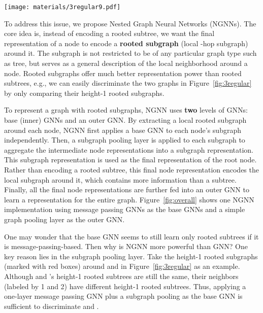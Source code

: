 \documentclass{article}
\begin{document}
\begin{figure*}[t]
\centering
\texttt{[image: materials/3regular9.pdf]}
\caption{The two original graphs  and  are non-isomorphic.  is composed of two triangles, while  is a hexagon. However, both 1-WL and message passing GNNs cannot differentiate them, since all nodes in the two graphs share identical rooted subtrees at any height (see the rooted subtrees around  and  in the middle block for example). In comparison, we can discriminate the two graphs by comparing their height-1 rooted subgraphs around any nodes. For example, the height-1 rooted subgraph around  is a closed triangle, but the height-1 rooted subgraph around  is an open triangle (see the red boxes in the right block).}
\label{fig:3regular}
\end{figure*}


To address this issue, we propose Nested Graph Neural Networks (NGNNs). The core idea is, instead of encoding a rooted subtree, we want the final representation of a node to encode a \textbf{rooted subgraph} (local -hop subgraph) around it. The subgraph is not restricted to be of any particular graph type such as tree, but serves as a general description of the local neighborhood around a node. Rooted subgraphs offer much better representation power than rooted subtrees, e.g., we can easily discriminate the two graphs in Figure~\ref{fig:3regular} by only comparing their height-1 rooted subgraphs.

To represent a graph with rooted subgraphs, NGNN uses \textbf{two} levels of GNNs: base (inner) GNNs and an outer GNN. By extracting a local rooted subgraph around each node, NGNN first applies a base GNN to each node's subgraph independently. Then, a subgraph pooling layer is applied to each subgraph to aggregate the intermediate node representations into a subgraph representation. This subgraph representation is used as the final representation of the root node. Rather than encoding a rooted subtree, this final node representation encodes the local subgraph around it, which contains more information than a subtree. Finally, all the final node representations are further fed into an outer GNN to learn a representation for the entire graph. Figure~\ref{fig:overall} shows one NGNN implementation using message passing GNNs as the base GNNs and a simple graph pooling layer as the outer GNN.

One may wonder that the base GNN seems to still learn only rooted subtrees if it is message-passing-based. Then why is NGNN more powerful than GNN? One key reason lies in the subgraph pooling layer. Take the height-1 rooted subgraphs (marked with red boxes) around  and  in Figure~\ref{fig:3regular} as an example. 
Although  and 's height-1 rooted subtrees are still the same, their neighbors (labeled by 1 and 2) have different height-1 rooted subtrees. Thus, applying a one-layer message passing GNN plus a subgraph pooling as the base GNN is sufficient to discriminate  and .
\end{document}
